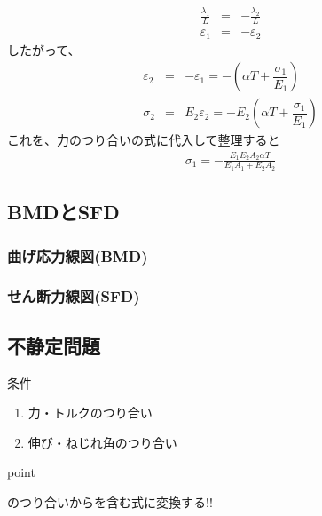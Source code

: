 \documentclass[a4paper]{jsarticle}
\begin{document}
\begin{enumerate}[(1)]
          \begin{eqnarray*}
              \frac{\lambda_1}{L}&=&-\frac{\lambda_2}{L}\\
              \varepsilon_1&=&-\varepsilon_2
          \end{eqnarray*}
          したがって、
          \begin{eqnarray*}
              \varepsilon_2&=&-\varepsilon_1=-\left(\alpha T+\dfrac{\sigma_1}{E_1}\right)\\
              \sigma_2&=&E_2\varepsilon_2=-E_2\left(\alpha T+\dfrac{\sigma_1}{E_1}\right)
          \end{eqnarray*}
          これを、力のつり合いの式に代入して整理すると
          \begin{eqnarray*}
              \sigma_1=-\frac{E_1E_2A_2\alpha T}{E_1A_1+E_2A_2}
          \end{eqnarray*}
\end{enumerate}
\subsection{BMDとSFD}
\subsubsection{曲げ応力線図(BMD)}
\subsubsection{せん断力線図(SFD)}
\subsection{不静定問題}
\begin{itembox}[l]{条件}
    \begin{enumerate}[(1)]
        \item 力・トルクのつり合い
        \item 伸び・ねじれ角のつり合い
    \end{enumerate}
\end{itembox}
\begin{itembox}[l]{point}
    \begin{center}
        のつり合いからを含む式に変換する!!
    \end{center}
\end{itembox}
\end{document}
